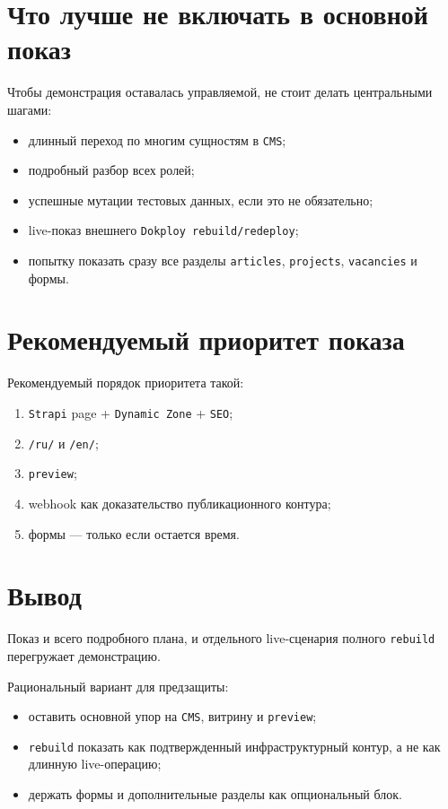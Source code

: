 \documentclass[12pt,a4paper]{article}
\begin{document}
\section*{Что лучше не включать в основной показ}

Чтобы демонстрация оставалась управляемой, не стоит делать центральными шагами:
\begin{itemize}
  \item длинный переход по многим сущностям в \texttt{CMS};
  \item подробный разбор всех ролей;
  \item успешные мутации тестовых данных, если это не обязательно;
  \item live-показ внешнего \texttt{Dokploy rebuild/redeploy};
  \item попытку показать сразу все разделы \texttt{articles}, \texttt{projects},
  \texttt{vacancies} и формы.
\end{itemize}

\section*{Рекомендуемый приоритет показа}

Рекомендуемый порядок приоритета такой:
\begin{enumerate}
  \item \texttt{Strapi} page + \texttt{Dynamic Zone} + \texttt{SEO};
  \item \texttt{/ru/} и \texttt{/en/};
  \item \texttt{preview};
  \item webhook как доказательство публикационного контура;
  \item формы --- только если остается время.
\end{enumerate}

\section*{Вывод}

Показ и всего подробного плана, и отдельного live-сценария полного \texttt{rebuild}
перегружает демонстрацию.

Рациональный вариант для предзащиты:
\begin{itemize}
  \item оставить основной упор на \texttt{CMS}, витрину и \texttt{preview};
  \item \texttt{rebuild} показать как подтвержденный инфраструктурный контур, а не как
  длинную live-операцию;
  \item держать формы и дополнительные разделы как опциональный блок.
\end{itemize}
\end{document}
